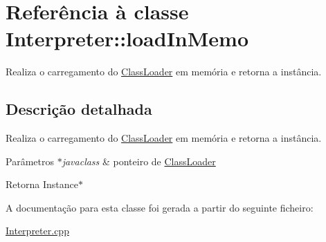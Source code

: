 \hypertarget{class_interpreter_1_1load_in_memo}{}\section{Referência à classe Interpreter\+:\+:load\+In\+Memo}
\label{class_interpreter_1_1load_in_memo}


Realiza o carregamento do \hyperlink{class_class_loader}{Class\+Loader} em memória e retorna a instância.  




\subsection{Descrição detalhada}
Realiza o carregamento do \hyperlink{class_class_loader}{Class\+Loader} em memória e retorna a instância. 


\begin{DoxyParams}{Parâmetros}
{\em $\ast$javaclass} & ponteiro de \hyperlink{class_class_loader}{Class\+Loader} \\
\hline
\end{DoxyParams}
\begin{DoxyReturn}{Retorna}
Instance$\ast$ 
\end{DoxyReturn}


A documentação para esta classe foi gerada a partir do seguinte ficheiro\+:\begin{DoxyCompactItemize}
\item 
\hyperlink{_interpreter_8cpp}{Interpreter.\+cpp}\end{DoxyCompactItemize}
